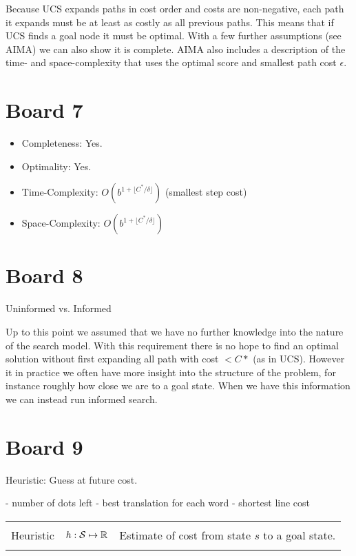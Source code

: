 \documentclass[10pt]{article}
\begin{document}
Because UCS expands paths in cost order and costs are non-negative,
each path it expands must be at least as costly as all previous paths.
This means that if UCS finds a goal node it must be optimal. With a few 
further assumptions (see AIMA) we can also show it is complete. AIMA also 
includes a description of the time- and space-complexity that uses 
the optimal score and smallest path cost $\epsilon$. 

\section{Board 7}

\begin{itemize}
\item Completeness: Yes.  
\item Optimality: Yes.
\item Time-Complexity: $O(b^{1 + \lfloor C^*/\delta \rfloor } )$  (smallest step cost)
\item Space-Complexity: $O(b^{1 + \lfloor C^*/\delta \rfloor } )$ 
\end{itemize}


\section{Board 8}

Uninformed vs. Informed



Up to this point we assumed that we have no further knowledge into the
nature of the search model. With this requirement there is no hope to
find an optimal solution without first expanding all path with cost $<
C*$ (as in UCS).  However it in practice we often have more insight
into the structure of the problem, for instance roughly how close we 
are to a goal state. When we have this information we can instead run 
informed search.


\section{Board 9}

Heuristic: Guess at future cost.

- number of dots left
- best translation for each word
- shortest line cost
\begin{center}
\begin{tabularx}{\linewidth}{llX}
  \toprule \\
 Heuristic & $h: \mathcal{S} \mapsto \mathbb{R}$ & Estimate of cost from state $s$ to a goal state. \\\\
\bottomrule
\end{tabularx}
\end{center}
\end{document}
